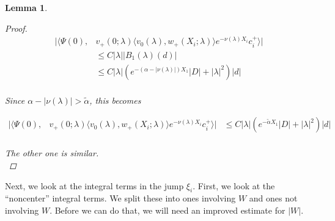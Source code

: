 \documentclass[12pt]{article}
\newtheorem{lemma}{Lemma}
\begin{document}
\begin{lemma}
\begin{proof}
\begin{align*}
|\langle \Psi(0), &v_+(0; \lambda) \langle v_0(\lambda), w_+(X_i; \lambda) \rangle e^{-\nu(\lambda)X_i} c_i^+ \rangle| \\ 
&\leq C |\lambda| |B_1(\lambda)(d)| \\
&\leq C |\lambda| ( e^{-(\alpha - |\nu(\lambda)|) X_1} |D| + |\lambda|^2 )|d| \\
\end{align*}

Since $\alpha - |\nu(\lambda)| > \tilde{\alpha}$, this becomes 

\begin{align*}
|\langle \Psi(0), &v_+(0; \lambda) \langle v_0(\lambda), w_+(X_i; \lambda) \rangle e^{-\nu(\lambda)X_i} c_i^+ \rangle| &\leq C |\lambda| ( e^{-\tilde{\alpha} X_1} |D| + |\lambda|^2 )|d| \\
\end{align*}
 
The other one is similar.\\

\end{proof} 
\end{lemma}

Next, we look at the integral terms in the jump $\xi_i$. First, we look at the ``noncenter'' integral terms. We split these into ones involving $W$ and ones not involving $W$. Before we can do that, we will need an improved estimate for $|W|$.
\end{document}
